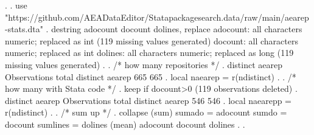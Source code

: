 . 
. use "https://github.com/AEADataEditor/Statapackagesearch.data/raw/main/aearep-stats.dta"
{\smallskip}
. destring adocount docount dolines, replace
adocount: all characters numeric; replaced as int
(119 missing values generated)
docount: all characters numeric; replaced as int
dolines: all characters numeric; replaced as long
(119 missing values generated)
{\smallskip}
. 
. /* how many repositories */
. distinct aearep
{\smallskip}
        {\VBAR}        Observations
        {\VBAR}      total   distinct
 aearep {\VBAR}        665        665
{\smallskip}
. local naearep = r(ndistinct)
{\smallskip}
. 
. /* how many with Stata code */
. keep if docount>0
(119 observations deleted)
{\smallskip}
. distinct aearep
{\smallskip}
        {\VBAR}        Observations
        {\VBAR}      total   distinct
 aearep {\VBAR}        546        546
{\smallskip}
. local naearepp = r(ndistinct)
{\smallskip}
. 
. /* sum up */
. collapse (sum) sumado = adocount sumdo = docount sumlines = dolines (mean) adocount docount dolines
{\smallskip}
. 
. 
